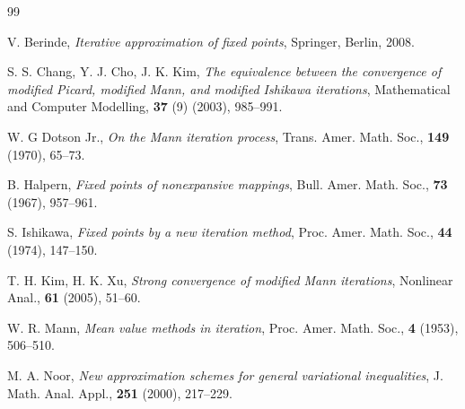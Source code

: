 \documentclass[a4paper, 11pt]{article}
\begin{document}
\begin{thebibliography}{99}
\footnotesize


 V. Berinde, {\em Iterative approximation of fixed points}, Springer, Berlin, 2008. 



  S. S. Chang, Y. J. Cho, J. K. Kim, {\em The equivalence between the convergence of modified Picard, modified Mann, and modified Ishikawa iterations}, Mathematical and Computer Modelling, {\bf 37} (9) (2003), 985--991.

 W. G Dotson Jr., {\em On the Mann iteration process},  Trans. Amer. Math. Soc., {\bf 149} (1970), 65--73.

 B. Halpern, {\em Fixed points of nonexpansive mappings}, Bull. Amer. Math. Soc., {\bf 73} (1967), 957--961.


 S. Ishikawa, {\em Fixed points by a new iteration method}, Proc. Amer. Math. Soc., {\bf 44} (1974), 147--150.

 T. H. Kim, H. K. Xu, {\em Strong convergence of modified Mann iterations}, Nonlinear Anal., {\bf 61} (2005), 51--60.


 W. R. Mann, {\em Mean value methods in iteration}, Proc. Amer. Math. Soc., {\bf 4} (1953), 506--510.

 M. A. Noor, {\em New approximation schemes for general variational inequalities}, J. Math. Anal. Appl., {\bf 251} (2000), 217--229.



\end{thebibliography}
\end{document}
